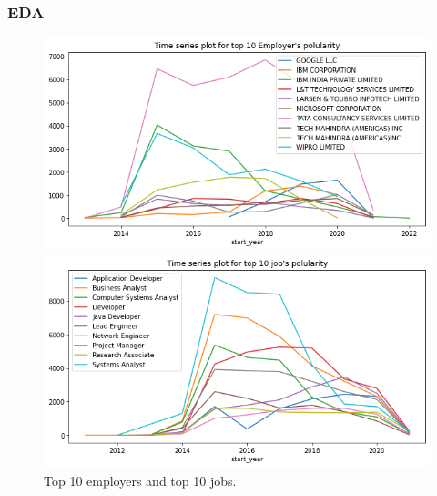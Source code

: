 \documentclass[10pt,mathserif]{beamer}
\begin{document}
	\begin{frame}
	\frametitle{EDA}
\begin{figure}[h]
	
	\centering
	\begin{minipage}{.48\linewidth}
		\includegraphics[width=\linewidth]{./photos/top10employers_timeseries.png}
		
		
	\end{minipage}
	\hfill
	\begin{minipage}{.48\linewidth}
		\includegraphics[width=\linewidth]{./photos/top10job_timeseries.png}
		
		
	\end{minipage}
	\caption{Top 10 employers and top 10 jobs.}
	\label{leastpopular}
\end{figure}
\end{frame}
\end{document}
